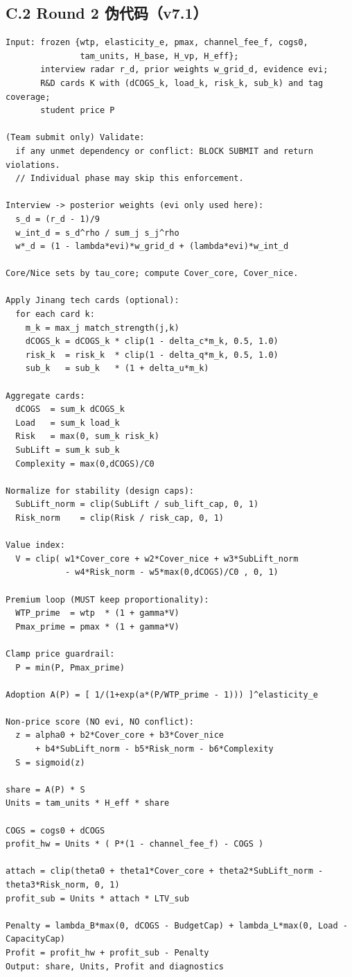 \documentclass[UTF8,12pt]{ctexart}
\begin{document}
\subsection{C.2 Round 2 伪代码（v7.1）}
\begin{verbatim}
Input: frozen {wtp, elasticity_e, pmax, channel_fee_f, cogs0,
               tam_units, H_base, H_vp, H_eff};
       interview radar r_d, prior weights w_grid_d, evidence evi;
       R&D cards K with (dCOGS_k, load_k, risk_k, sub_k) and tag coverage;
       student price P

(Team submit only) Validate:
  if any unmet dependency or conflict: BLOCK SUBMIT and return violations.
  // Individual phase may skip this enforcement.

Interview -> posterior weights (evi only used here):
  s_d = (r_d - 1)/9
  w_int_d = s_d^rho / sum_j s_j^rho
  w*_d = (1 - lambda*evi)*w_grid_d + (lambda*evi)*w_int_d

Core/Nice sets by tau_core; compute Cover_core, Cover_nice.

Apply Jinang tech cards (optional):
  for each card k:
    m_k = max_j match_strength(j,k)
    dCOGS_k = dCOGS_k * clip(1 - delta_c*m_k, 0.5, 1.0)
    risk_k  = risk_k  * clip(1 - delta_q*m_k, 0.5, 1.0)
    sub_k   = sub_k   * (1 + delta_u*m_k)

Aggregate cards:
  dCOGS  = sum_k dCOGS_k
  Load   = sum_k load_k
  Risk   = max(0, sum_k risk_k)
  SubLift = sum_k sub_k
  Complexity = max(0,dCOGS)/C0

Normalize for stability (design caps):
  SubLift_norm = clip(SubLift / sub_lift_cap, 0, 1)
  Risk_norm    = clip(Risk / risk_cap, 0, 1)

Value index:
  V = clip( w1*Cover_core + w2*Cover_nice + w3*SubLift_norm
            - w4*Risk_norm - w5*max(0,dCOGS)/C0 , 0, 1)

Premium loop (MUST keep proportionality):
  WTP_prime  = wtp  * (1 + gamma*V)
  Pmax_prime = pmax * (1 + gamma*V)

Clamp price guardrail:
  P = min(P, Pmax_prime)

Adoption A(P) = [ 1/(1+exp(a*(P/WTP_prime - 1))) ]^elasticity_e

Non-price score (NO evi, NO conflict):
  z = alpha0 + b2*Cover_core + b3*Cover_nice
      + b4*SubLift_norm - b5*Risk_norm - b6*Complexity
  S = sigmoid(z)

share = A(P) * S
Units = tam_units * H_eff * share

COGS = cogs0 + dCOGS
profit_hw = Units * ( P*(1 - channel_fee_f) - COGS )

attach = clip(theta0 + theta1*Cover_core + theta2*SubLift_norm - theta3*Risk_norm, 0, 1)
profit_sub = Units * attach * LTV_sub

Penalty = lambda_B*max(0, dCOGS - BudgetCap) + lambda_L*max(0, Load - CapacityCap)
Profit = profit_hw + profit_sub - Penalty
Output: share, Units, Profit and diagnostics
\end{verbatim}
\end{document}
